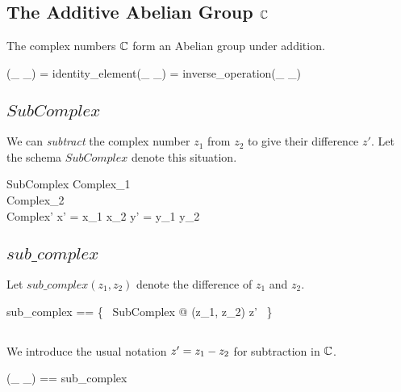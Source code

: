 \documentclass[11pt, oneside]{article}
\begin{document}
\subsection{The Additive Abelian Group $\mathbb{C}$}

\begin{theorem}

The complex numbers $\mathbb{C}$ form an Abelian group under addition.

\begin{zed}
(\_ \addC \_) \in \abgroup \C
\also
\zeroC = identity\_element(\_ \addC \_)
\also
\negC = inverse\_operation(\_ \addC \_)
\end{zed}

\end{theorem}

\subsection{$SubComplex$}

We can \textit{subtract} the complex number $z_1$ from $z_2$
to give their difference $z'$.
Let the schema $SubComplex$ denote this situation.

\begin{schema}{SubComplex}
	Complex_1 \\
	Complex_2 \\
	Complex'
\where
	x' = x_1 \subR x_2
\also
	y' = y_1 \subR y_2
\end{schema}

\subsection{$sub\_complex$}

Let $sub\_complex(z_1, z_2)$ denote the difference of $z_1$ and $z_2$.

\begin{zed}
	sub\_complex == \{~ SubComplex @ (z_1, z_2) \mapsto z' ~\}
\end{zed}

\subsection{}

We introduce the usual notation $z' = z_1 \mathbin{-} z_2$ for subtraction in $\mathbb{C}$.

\begin{zed}
	(\_ \subC \_) == sub\_complex
\end{zed}
\end{document}
